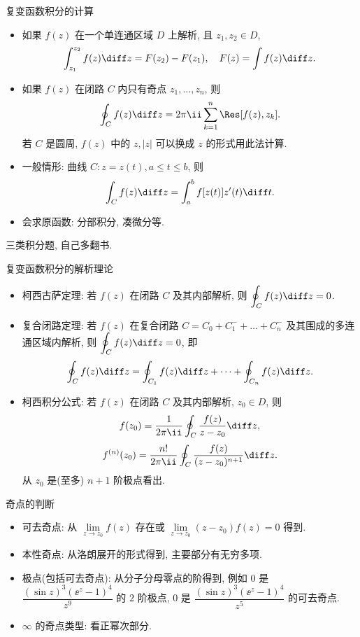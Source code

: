 \documentclass[aspectratio=169,handout]{ctexbeamer}
\begin{document}
\begin{frame}{复变函数积分的计算}
	\beqskip{3pt}
	\begin{itemize}
		\item 如果 $f(z)$ 在一个单连通区域 $D$ 上解析, 且 $z_1,z_2\in D$,
	\[
			\int_{z_1}^{z_2}f(z)\diff z=F(z_2)-F(z_1),\quad
			F(z)=\int f(z)\diff z.
	\]
		\item 如果 $f(z)$ 在闭路 $C$ 内只有奇点 $z_1,\dots,z_n$, 则
	\[
			\oint_C f(z)\diff z=2\pi\ii\sum_{k=1}^n\Res[f(z),z_k].
	\]
		若 $C$ 是圆周, $f(z)$ 中的 $z,|z|$ 可以换成 $z$ 的形式用此法计算.
		\item 一般情形: 曲线 $C:z=z(t),a\le t\le b$, 则
	\[
			\int_C f(z)\diff z=\int_a^b f[z(t)]z'(t)\diff t.
	\]
		\item 会求原函数: 分部积分, 凑微分等.
	\end{itemize}
	\onslide<+->
	\begin{exercise}
		三类积分题, 自己多翻书.
	\end{exercise}
	\endgroup
\end{frame}


\begin{frame}{复变函数积分的解析理论}
	\begin{itemize}
		\item 柯西古萨定理: 若 $f(z)$ 在闭路 $C$ 及其内部解析, 则 $\displaystyle\oint_Cf(z)\diff z=0$.
		\item 复合闭路定理: 若 $f(z)$ 在复合闭路 $C=C_0+C_1^-+\dots+C_n^-$ 及其围成的多连通区域内解析, 则 $\displaystyle\oint_Cf(z)\diff z=0$, 即
	\[
			\oint_Cf(z)\diff z=\oint_{C_1}f(z)\diff z+\cdots+\oint_{C_n}f(z)\diff z.
	\]
		\item 柯西积分公式: 若 $f(z)$ 在闭路 $C$ 及其内部解析, $z_0\in D$, 则
	\[
			f(z_0)=\frac{1}{2\pi\ii}\oint_C\frac{f(z)}{z-z_0}\diff z,
	\]
	\[
			f^{(n)}(z_0)=\frac{n!}{2\pi\ii}\oint_C\frac{f(z)}{(z-z_0)^{n+1}}\diff z.
	\]
		从 $z_0$ 是(至多) $n+1$ 阶极点看出.
	\end{itemize}
\end{frame}


\begin{frame}{奇点的判断}
	\begin{itemize}
		\item 可去奇点: 从 $\lim\limits_{z\to z_0}f(z)$ 存在或 $\lim\limits_{z\to z_0}(z-z_0)f(z)=0$ 得到.
		\item 本性奇点: 从洛朗展开的形式得到, 主要部分有无穷多项.
		\item 极点(包括可去奇点): 从分子分母零点的阶得到, 例如
		$0$ 是 $\dfrac{(\sin z)^3(\ee^z-1)^4}{z^9}$ 的 $2$ 阶极点,
		$0$ 是 $\dfrac{(\sin z)^3(\ee^z-1)^4}{z^5}$ 的可去奇点.
		\item $\infty$ 的奇点类型: 看正幂次部分.
	\end{itemize}
\end{frame}
\end{document}
